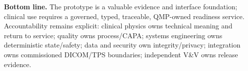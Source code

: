 \documentclass[11pt,letterpaper]{article}
\begin{document}
\textbf{Bottom line.} The prototype is a valuable evidence and interface foundation; clinical use requires a governed, typed, traceable, QMP-owned readiness service. Accountability remains explicit: clinical physics owns technical meaning and return to service; quality owns process/CAPA; systems engineering owns deterministic state/safety; data and security own integrity/privacy; integration owns commissioned DICOM/TPS boundaries; independent V\&V owns release evidence.
\end{document}
